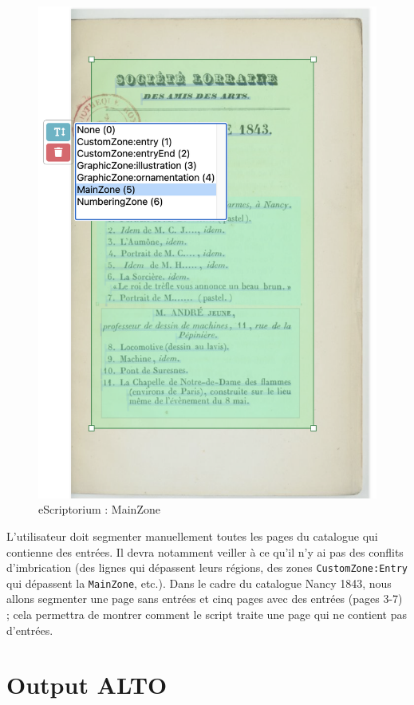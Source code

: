 \documentclass[a4paper,12pt,twoside]{book}
\begin{document}
\begin{figure}[ht]
	\centering
	\includegraphics[scale=0.5]{MainZone_eScriptorium.png}		
	\caption{eScriptorium : MainZone}
\end{figure}

L'utilisateur doit segmenter manuellement toutes les pages du catalogue qui contienne des entrées. Il devra notamment veiller à ce qu'il n'y ai pas des conflits d'imbrication (des lignes qui dépassent leurs régions, des zones \texttt{CustomZone:Entry} qui dépassent la \texttt{MainZone}, etc.). Dans le cadre du catalogue Nancy 1843, nous allons segmenter une page sans entrées et cinq pages avec des entrées (pages 3-7) ; cela permettra de montrer comment le script traite une page qui ne contient pas d'entrées.


\section{Output ALTO}
\end{document}
